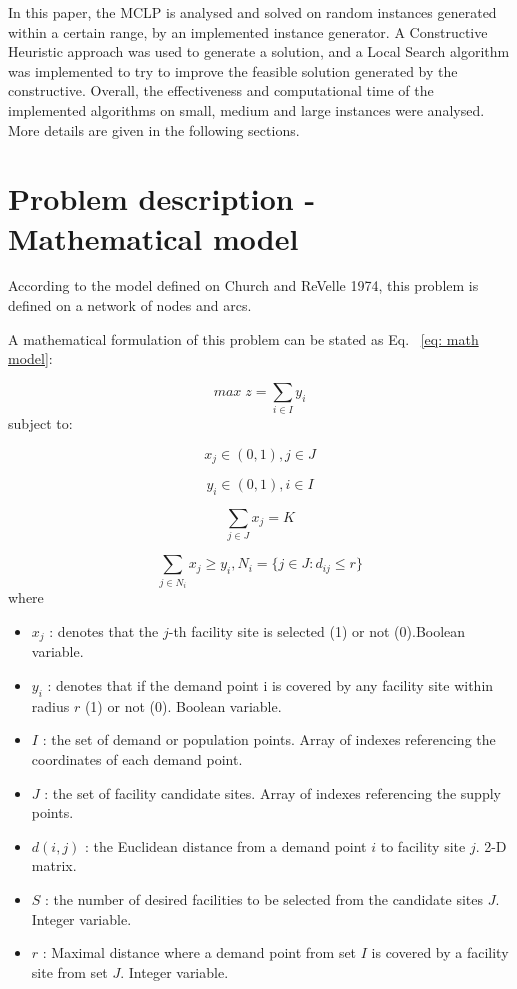 \documentclass[11pt, a4paper]{article}
\begin{document}
In this paper, the MCLP is analysed and solved on random instances generated within a certain range, by an implemented instance generator. A Constructive Heuristic approach was used to generate a solution, and a Local Search algorithm was implemented to try to improve the feasible solution generated by the constructive. Overall, the effectiveness and computational time of the implemented algorithms on small, medium and large instances were analysed. More details are given in the following sections.

\section{Problem description - Mathematical model}\label{sec:lit}
According to the model defined on Church and ReVelle 1974, this problem is defined on a network of nodes and arcs. 

A mathematical formulation of this problem can be stated as Eq. ~\ref{eq: math model}:

\begin{equation}\label{eq: math model}
	max \; z = \sum_{i \in I}y_i
\end{equation}
subject to:

\begin{equation}\label{eq: r1}
	x_{j} \in (0,1), j \in J
\end{equation}

\begin{equation}\label{eq: r2}
	y_{i} \in (0,1), i \in I
\end{equation}

\begin{equation}\label{eq: r3}
	\sum_{j \in J}x_j = K
\end{equation}

\begin{equation}\label{eq: r4}
	\sum_{j \in N_i} x_j \geq y_i, N_i = \big\{ j \in J: d_{ij} \leq r \big\}
\end{equation}
where

\begin{itemize}
	\item $x_{j}$ : denotes that the $j$-th facility site is selected (1) or not (0).Boolean variable.
	\item $y_{i}$ : denotes that if the demand point i is covered by any facility site within radius $r$ (1) or not (0). Boolean variable.
	\item $I$ : the set of demand or population points. Array of indexes referencing the coordinates of each demand point.
	\item $J$ : the set of facility candidate sites. Array of indexes referencing the supply points.
	\item $d(i,j)$ : the Euclidean distance from a demand point $i$ to facility site $j$. 2-D matrix.
	\item $S$ : the number of desired facilities to be selected from the candidate sites $J$. Integer variable.
	\item $r$ : Maximal distance where a demand point from set $I$ is covered by a facility site from set $J$. Integer variable.
\end{itemize}
\end{document}
